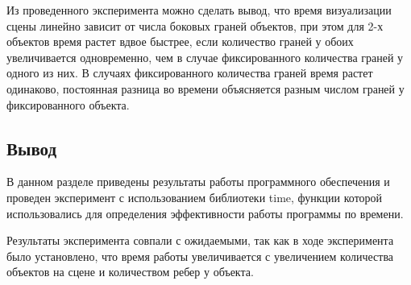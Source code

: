 Из проведенного эксперимента можно сделать вывод, что время визуализации сцены линейно зависит от числа боковых граней объектов, при этом для 2-х объектов время растет вдвое быстрее, если количество граней у обоих увеличивается одновременно, чем в случае фиксированного количества граней у одного из них. В случаях фиксированного количества граней время растет одинаково, постоянная разница во времени объясняется разным числом граней у фиксированного объекта.

\subsection*{Вывод}
В данном разделе приведены результаты работы программного
обеспечения и проведен эксперимент с использованием библиотеки time,
функции которой использовались для определения эффективности работы
программы по времени.

Результаты эксперимента совпали с ожидаемыми, так как в ходе
эксперимента было установлено, что время работы увеличивается с увеличением
количества объектов на сцене и количеством ребер у объекта.
